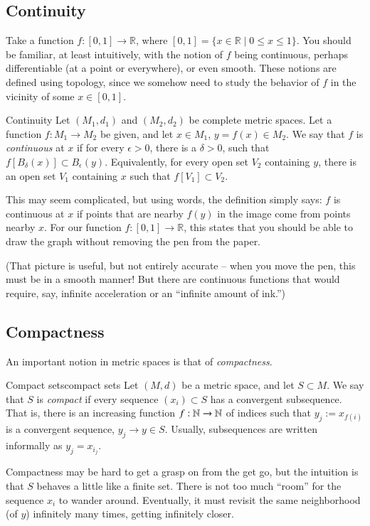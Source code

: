 \subsection{Continuity}


Take a function $f : [0,1] \to \mathbb{R}$, where $[0,1] = \{ x \in\mathbb{R} \mid 0 \leq x \leq 1\}$. You should be familiar, at least intuitively, with the notion of $f$ being continuous, perhaps differentiable (at a point or everywhere), or even smooth. These notions are defined using topology, since we somehow need to study the behavior of $f$ in the vicinity of some $x\in [0,1]$.

\begin{myDefinition}{Continuity}{}
    Let $(M_1,d_1)$ and $(M_2,d_2)$ be complete metric spaces.
    Let a function $f : M_1 \to M_2$ be given, and let $x \in M_1$, $y = f(x) \in M_2$. We say that $f$ is \emph{continuous} at $x$ if for every $\epsilon > 0$, there is a $\delta > 0$, such that $f[B_\delta(x)] \subset B_\epsilon(y)$. Equivalently, for every open set $V_2$ containing $y$, there is an open set $V_1$ containing $x$ such that $f[V_1]\subset V_2$. 
\end{myDefinition}
This may seem complicated, but using words, the definition simply says: $f$ is continuous at $x$ if points that are nearby $f(y)$ in the image come from points nearby $x$. For our function $f : [0,1] \to \mathbb{R}$, this states that you should be able to draw the graph without removing the pen from the paper.


(That picture is useful, but not entirely accurate -- when you move the pen, this must be in a smooth manner! But there are continuous functions that would require, say, infinite acceleration or an ``infinite amount of ink.'')


\subsection{Compactness}

An important notion in metric spaces is that of \emph{compactness}.
\begin{myDefinition}{Compact sets}{compact sets}
    Let $(M,d)$ be a metric space, and let $S\subset M$. We say that $S$ is \emph{compact} if
    every sequence $(x_i)\subset S$ has a convergent subsequence. That is,
    there is an increasing function $f:\mathbb{N}\to\mathbb{N}$ of indices such that $y_j := x_{f(i)}$ is a convergent sequence,
    $y_j \to y \in S$. Usually, subsequences are written informally as $y_j = x_{i_j}$.
\end{myDefinition}
Compactness may be hard to get a grasp on from the get go, but the intuition is that $S$ behaves a little like
a finite set. There is not too much ``room'' for the sequence $x_i$ to wander around. Eventually, it must revisit
the same neighborhood (of $y$) infinitely many times, getting infinitely closer.

